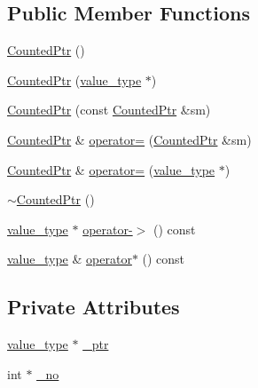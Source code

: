 \subsection*{\-Public \-Member \-Functions}
\begin{DoxyCompactItemize}
\item 
\hyperlink{classOOP_1_1CountedPtr_ae4ac1ddad6538a7281548fd57f5ce158}{\-Counted\-Ptr} ()
\item 
\hyperlink{classOOP_1_1CountedPtr_a9e67f7da194834072589bca1dce8ccd1}{\-Counted\-Ptr} (\hyperlink{namespaceOOP_a98bf9fa44d8f36499284c9d57c1958aa}{value\-\_\-type} $\ast$)
\item 
\hyperlink{classOOP_1_1CountedPtr_ac5c681d51cd855f36324c467a815618e}{\-Counted\-Ptr} (const \hyperlink{classOOP_1_1CountedPtr}{\-Counted\-Ptr} \&sm)
\item 
\hyperlink{classOOP_1_1CountedPtr}{\-Counted\-Ptr} \& \hyperlink{classOOP_1_1CountedPtr_a36dcaf2d0c344daccdee0a4a51f78728}{operator=} (\hyperlink{classOOP_1_1CountedPtr}{\-Counted\-Ptr} \&sm)
\item 
\hyperlink{classOOP_1_1CountedPtr}{\-Counted\-Ptr} \& \hyperlink{classOOP_1_1CountedPtr_af0a02d043048c2320399f8da522b7d83}{operator=} (\hyperlink{namespaceOOP_a98bf9fa44d8f36499284c9d57c1958aa}{value\-\_\-type} $\ast$)
\item 
\hyperlink{classOOP_1_1CountedPtr_ac4722fd3d5938a1527492acfe4a65a8c}{$\sim$\-Counted\-Ptr} ()
\item 
\hyperlink{namespaceOOP_a98bf9fa44d8f36499284c9d57c1958aa}{value\-\_\-type} $\ast$ \hyperlink{classOOP_1_1CountedPtr_ab2b2a4dc75829686c60fff3194da9cb9}{operator-\/$>$} () const 
\item 
\hyperlink{namespaceOOP_a98bf9fa44d8f36499284c9d57c1958aa}{value\-\_\-type} \& \hyperlink{classOOP_1_1CountedPtr_a2c840594d489eb2f7016e5da227f95e2}{operator$\ast$} () const 
\end{DoxyCompactItemize}
\subsection*{\-Private \-Attributes}
\begin{DoxyCompactItemize}
\item 
\hyperlink{namespaceOOP_a98bf9fa44d8f36499284c9d57c1958aa}{value\-\_\-type} $\ast$ \hyperlink{classOOP_1_1CountedPtr_a2bd5db7ffc59b7811e484c3e858950bd}{\-\_\-ptr}
\item 
int $\ast$ \hyperlink{classOOP_1_1CountedPtr_a9d5241ddb1470e29311d70f8d8ac451b}{\-\_\-no}
\end{DoxyCompactItemize}
